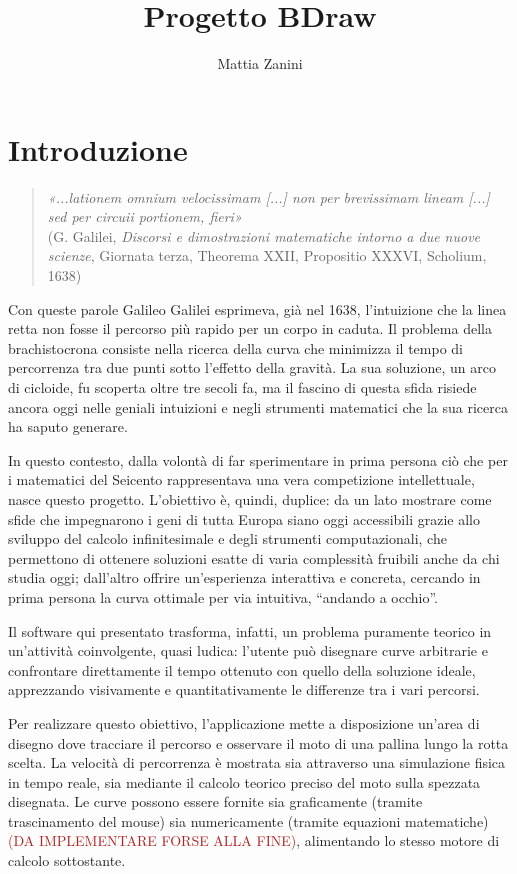 \documentclass[a4paper,12pt]{article} %
\title{Progetto BDraw}
\author{Mattia Zanini}
\date{}
\begin{document}
\maketitle
\doublespacing

\section*{Introduzione}

\begin{quote}
    \textit{«...lationem omnium velocissimam [...] non per brevissimam lineam [...] sed per circuii portionem, fieri»} \\
    \footnotesize{(G. Galilei, \textit{Discorsi e dimostrazioni matematiche intorno a due nuove scienze}, Giornata terza, Theorema XXII, Propositio XXXVI, Scholium, 1638)}
\end{quote}

Con queste parole Galileo Galilei esprimeva, già nel 1638, l'intuizione che la linea retta non fosse il percorso più rapido per un corpo in caduta. Il problema della brachistocrona consiste nella ricerca della curva che minimizza il tempo di percorrenza tra due punti sotto l'effetto della gravità. La sua soluzione, un arco di cicloide, fu scoperta oltre tre secoli fa, ma il fascino di questa sfida risiede ancora oggi nelle geniali intuizioni e negli strumenti matematici che la sua ricerca ha saputo generare.

In questo contesto, dalla volontà di far sperimentare in prima persona ciò che per i matematici del Seicento rappresentava una vera competizione intellettuale, nasce questo progetto. L'obiettivo è, quindi, duplice: da un lato mostrare come sfide che impegnarono i geni di tutta Europa siano oggi accessibili grazie allo sviluppo del calcolo infinitesimale e degli strumenti computazionali, che permettono di ottenere soluzioni esatte di varia complessità fruibili anche da chi studia oggi; dall'altro offrire un'esperienza interattiva e concreta, cercando in prima persona la curva ottimale per via intuitiva, ``andando a occhio''.

Il software qui presentato trasforma, infatti,  un problema puramente teorico in un'attività coinvolgente, quasi ludica: l'utente può disegnare curve arbitrarie e confrontare direttamente il tempo ottenuto con quello della soluzione ideale, apprezzando visivamente e quantitativamente le differenze tra i vari percorsi.

Per realizzare questo obiettivo, l'applicazione mette a disposizione un'area di disegno dove tracciare il percorso e osservare il moto di una pallina lungo la rotta scelta. La velocità di percorrenza è mostrata sia attraverso una simulazione fisica in tempo reale, sia mediante il calcolo teorico preciso del moto sulla spezzata disegnata. Le curve possono essere fornite sia graficamente (tramite trascinamento del mouse) sia numericamente (tramite equazioni matematiche) \textcolor{firebrick}{(DA IMPLEMENTARE FORSE ALLA FINE)}, alimentando lo stesso motore di calcolo sottostante.
\end{document}
